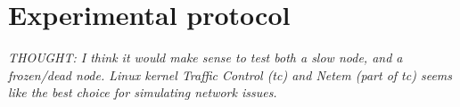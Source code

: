 
\section{Experimental protocol}\label{sec:experimental-protocol}

\textit{THOUGHT: I think it would make sense to test both a slow node, and a frozen/dead node.
Linux kernel Traffic Control (tc) and Netem (part of tc) seems like the best choice for simulating network issues.}